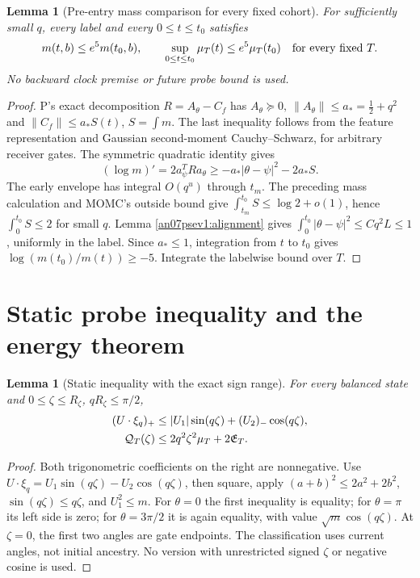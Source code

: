 \documentclass[11pt]{article}
\numberwithin{equation}{section}
\newtheorem{lemma}[theorem]{Lemma}
\theoremstyle{remark}\newtheorem{remark}[theorem]{Remark}
\newcommand{\EE}{\mathfrak E}
\begin{document}
\begin{lemma}[Pre-entry mass comparison for every fixed cohort]
\label{an07psev1:backmass}
For sufficiently small \(q\), every label and every \(0\le t\le t_0\)
satisfies
\[
 m(t,b)\le e^5m(t_0,b),\qquad
 \sup_{0\le t\le t_0}\mu_T(t)\le e^5\mu_T(t_0)
 \quad\hbox{for every fixed }T .
 \label{an07psev1:backmassbound}
 \]
No backward clock premise or future probe bound is used.
\end{lemma}
\begin{proof}
P's exact decomposition \(R=A_\theta-C_f\) has
\(A_\theta\succeq0,\ \|A_\theta\|\le a_*=\frac12+q^2\)
and \(\|C_f\|\le a_*S(t)\), \(S=\int m\).
The last inequality follows from the feature representation
and Gaussian second-moment Cauchy--Schwarz, for arbitrary
receiver gates. The symmetric quadratic identity gives
\[
 (\log m)'=2a_\psi^TRa_\theta
          \ge-a_*|\theta-\psi|^2-2a_*S.
 \]
The early envelope has integral \(O(q^u)\) through \(t_m\).
The preceding mass calculation and MOMC's outside bound give
\(\int_{t_m}^{t_0}S\le\log2+o(1)\), hence
\(\int_0^{t_0}S\le2\) for small \(q\).
Lemma \ref{an07psev1:alignment} gives
\(\int_0^{t_0}|\theta-\psi|^2\le Cq^2L\le1\), uniformly
in the label. Since \(a_*\le1\), integration from \(t\) to
\(t_0\) gives \(\log(m(t_0)/m(t))\ge-5\).
Integrate the labelwise bound over \(T\).
\end{proof}

\section{Static probe inequality and the energy theorem}
\label{an07psev1:energysection}
\begin{lemma}[Static inequality with the exact sign range]
\label{an07psev1:static}
For every balanced state and \(0\le\zeta\le R_\zeta\),
\(qR_\zeta\le\pi/2\),
\begin{align}
 (U\cdot\xi_q)_+
 &\le |U_1|\sin(q\zeta)+(U_2)_-\cos(q\zeta),\notag\\
 \mathcal Q_T(\zeta)&\le2q^2\zeta^2\mu_T+2\EE_T .
 \label{an07psev1:staticbound}
\end{align}
\end{lemma}
\begin{proof}
Both trigonometric coefficients on the right are nonnegative.
Use \(U\cdot\xi_q=U_1\sin(q\zeta)-U_2\cos(q\zeta)\),
then square, apply \((a+b)^2\le2a^2+2b^2\),
\(\sin(q\zeta)\le q\zeta\), and \(U_1^2\le m\).
For \(\theta=0\) the first inequality is equality;
for \(\theta=\pi\) its left side is zero; for
\(\theta=3\pi/2\) it is again equality, with value
\(\sqrt m\cos(q\zeta)\). At \(\zeta=0\), the first two
angles are gate endpoints. The classification uses current
angles, not initial ancestry. No version with unrestricted
signed \(\zeta\) or negative cosine is used.
\end{proof}
\end{document}
